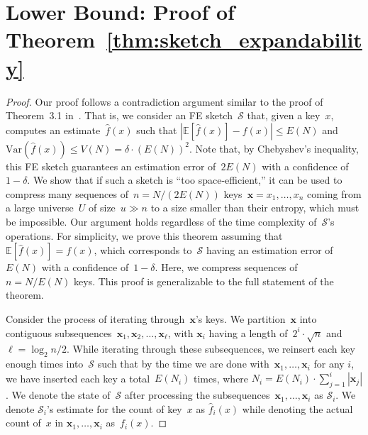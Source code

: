 \documentclass[sigconf]{acmart}
\begin{document}
\section{Lower Bound: Proof of Theorem~\ref{thm:sketch_expandability}}\label{apx:ommitted_proofs_lower}
\thmsketchexpandabilitylabel*
\begin{proof}
    Our proof follows a contradiction argument similar to the proof of
    Theorem~3.1 in~\cite{PaghExpandability}. That is, we consider an FE
    sketch~$\mathcal{S}$ that, given a key~$x$, computes an
    estimate~$\hat{f}(x)$ such that $|\mathbb{E}[\hat{f}(x)] - f(x)| \leq E(N)$
    and $\mathrm{Var}(\hat{f}(x)) \leq V(N) = \delta \cdot (E(N))^2$. Note
    that, by Chebyshev's inequality, this FE sketch guarantees an estimation
    error of~$2E(N)$ with a confidence of~$1-\delta$. We show that if such a
    sketch is ``too space-efficient,'' it can be used to compress many
    sequences of~$n=N/(2E(N))$ keys~$\mathbf{x}=x_1,\dots,x_n$ coming from a
    large universe~$U$ of size~$u \gg n$ to a size smaller than their entropy,
    which must be impossible. Our argument holds regardless of the time
    complexity of~$\mathcal{S}$'s operations. For simplicity, we prove this
    theorem assuming that~$\mathbb{E}[\hat{f}(x)]=f(x)$, which corresponds
    to~$\mathcal{S}$ having an estimation error of~$E(N)$ with a confidence
    of~$1-\delta$. Here, we compress sequences of~$n=N/E(N)$ keys. This proof
    is generalizable to the full statement of the theorem.

    Consider the process of iterating through~$\mathbf{x}$'s keys. We
    partition~$\mathbf{x}$ into contiguous subsequences~$\mathbf{x}_1,
    \mathbf{x}_2, \dots, \mathbf{x}_\ell$, with $\mathbf{x}_i$ having a length
    of~$2^i \cdot \sqrt{n}$ and $\ell=\log_2 n/2$. While iterating through
    these subsequences, we reinsert each key enough times into~$\mathcal{S}$
    such that by the time we are done with~$\mathbf{x}_1,\dots,\mathbf{x}_i$
    for any $i$, we have inserted each key a total~$E(N_i)$ times, where
    $N_i=E(N_i) \cdot \sum_{j=1}^i |\mathbf{x}_j|$. We denote the state
    of~$\mathcal{S}$ after processing the subsequences~$\mathbf{x}_1, \dots,
    \mathbf{x}_i$ as $\mathcal{S}_i$. We denote $\mathcal{S}_i$'s estimate for
    the count of key~$x$ as $\hat{f}_i(x)$ while denoting the actual count
    of~$x$ in $\mathbf{x}_1, \dots, \mathbf{x}_i$ as~$f_i(x)$. 


\end{proof}
\end{document}
